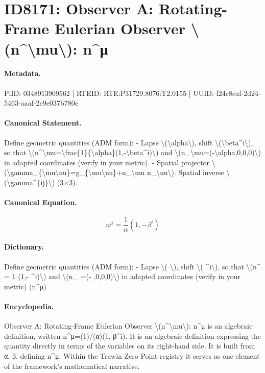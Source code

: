 \section*{ID8171: Observer A: Rotating-Frame Eulerian Observer \textbackslash{}(n\textasciicircum{}\textbackslash{}mu\textbackslash{}): n\textasciicircum{}μ}
\paragraph{Metadata.}
PiID: 0348913909562 | RTEID: RTE:P31729.8076:T2.0155 | UUID: f24c8eaf-2d24-5463-aaaf-2e9e037b780e

\paragraph{Canonical Statement.}
Define geometric quantities (ADM form): - Lapse \textbackslash{}(\textbackslash{}alpha\textbackslash{}), shift \textbackslash{}(\textbackslash{}beta\textasciicircum{}i\textbackslash{}), so that \textbackslash{}(n\textasciicircum{}\textbackslash{}mu=\textbackslash{}frac\{1\}\{\textbackslash{}alpha\}(1,-\textbackslash{}beta\textasciicircum{}i)\textbackslash{}) and \textbackslash{}(n\_\textbackslash{}mu=(-\textbackslash{}alpha,0,0,0)\textbackslash{}) in adapted coordinates (verify in your metric). - Spatial projector \textbackslash{}(\textbackslash{}gamma\_\{\textbackslash{}mu\textbackslash{}nu\}=g\_\{\textbackslash{}mu\textbackslash{}nu\}+n\_\textbackslash{}mu n\_\textbackslash{}nu\textbackslash{}). Spatial inverse \textbackslash{}(\textbackslash{}gamma\textasciicircum{}\{ij\}\textbackslash{}) (3×3).

\paragraph{Canonical Equation.}
\[
n^\mu=\frac{1}{\alpha}(1,-\beta^i)
\]

\paragraph{Dictionary.}
Define geometric quantities (ADM form): - Lapse \textbackslash{}( \textbackslash{}), shift \textbackslash{}( \textasciicircum{}i\textbackslash{}), so that \textbackslash{}(n\textasciicircum{} = 1 (1,- \textasciicircum{}i)\textbackslash{}) and \textbackslash{}(n\_ =(- ,0,0,0)\textbackslash{}) in adapted coordinates (verify in your metric) (n\textasciicircum{}μ)

\paragraph{Encyclopedia.}
Observer A: Rotating-Frame Eulerian Observer \textbackslash{}(n\textasciicircum{}\textbackslash{}mu\textbackslash{}): n\textasciicircum{}μ is an algebraic definition, written n\textasciicircum{}μ=(1)/(α)(1,-β\textasciicircum{}i). It is an algebraic definition expressing the quantity directly in terms of the variables on its right-hand side. It is built from α, β, defining n\textasciicircum{}μ. Within the Trawin Zero Point registry it serves as one element of the framework's mathematical narrative.
